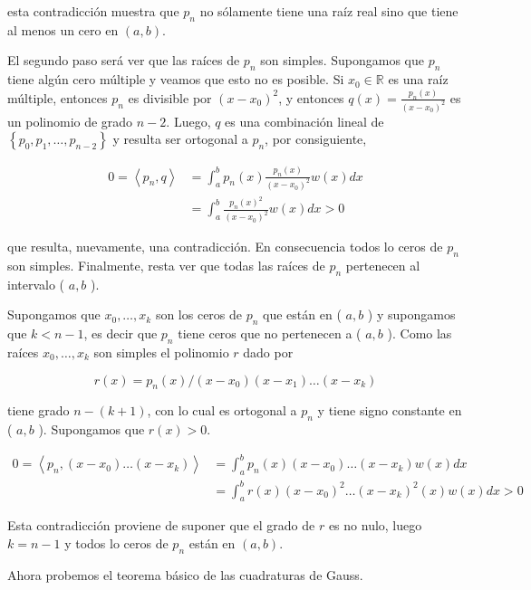 \documentclass[10pt]{article}
\begin{document}
esta contradicción muestra que $p_{n}$ no sólamente tiene una raíz real sino que tiene al menos un cero en $(a, b)$.

El segundo paso será ver que las raíces de $p_{n}$ son simples. Supongamos que $p_{n}$ tiene algún cero múltiple y veamos que esto no es posible. Si $x_{0} \in \mathbb{R}$ es una raíz múltiple, entonces $p_{n}$ es divisible por $\left(x-x_{0}\right)^{2}$, y entonces $q(x)=\frac{p_{n}(x)}{\left(x-x_{0}\right)^{2}}$ es un polinomio de grado $n-2$. Luego, $q$ es una combinación lineal de $\left\{p_{0}, p_{1}, \ldots, p_{n-2}\right\}$ y resulta ser ortogonal a $p_{n}$, por consiguiente,

$$
\begin{aligned}
0=\left\langle p_{n}, q\right\rangle & =\int_{a}^{b} p_{n}(x) \frac{p_{n}(x)}{\left(x-x_{0}\right)^{2}} w(x) d x \\
& =\int_{a}^{b} \frac{p_{n}(x)^{2}}{\left(x-x_{0}\right)^{2}} w(x) d x>0
\end{aligned}
$$

que resulta, nuevamente, una contradicción. En consecuencia todos lo ceros de $p_{n}$ son simples. Finalmente, resta ver que todas las raíces de $p_{n}$ pertenecen al intervalo ( $a, b$ ).

Supongamos que $x_{0}, \ldots, x_{k}$ son los ceros de $p_{n}$ que están en ( $a, b$ ) y supongamos que $k<n-1$, es decir que $p_{n}$ tiene ceros que no pertenecen a ( $a, b$ ). Como las raíces $x_{0}, \ldots, x_{k}$ son simples el polinomio $r$ dado por

$$
r(x)=p_{n}(x) /\left(x-x_{0}\right)\left(x-x_{1}\right) \ldots\left(x-x_{k}\right)
$$

tiene grado $n-(k+1)$, con lo cual es ortogonal a $p_{n}$ y tiene signo constante en ( $a, b$ ). Supongamos que $r(x)>0$.

$$
\begin{aligned}
0=\left\langle p_{n},\left(x-x_{0}\right) \ldots\left(x-x_{k}\right)\right\rangle & =\int_{a}^{b} p_{n}(x)\left(x-x_{0}\right) \ldots\left(x-x_{k}\right) w(x) d x \\
& =\int_{a}^{b} r(x)\left(x-x_{0}\right)^{2} \ldots\left(x-x_{k}\right)^{2}(x) w(x) d x>0
\end{aligned}
$$

Esta contradicción proviene de suponer que el grado de $r$ es no nulo, luego $k=n-1$ y todos lo ceros de $p_{n}$ están en $(a, b)$.

Ahora probemos el teorema básico de las cuadraturas de Gauss.
\end{document}
